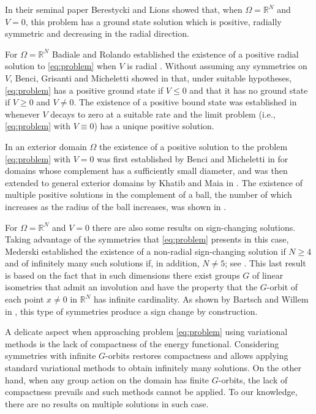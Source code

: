 \documentclass[10pt,letterpaper]{article}
\numberwithin{equation}{section}
\def\rn{\mathbb{R}^N}
\def\o{\Omega}
\begin{document}
In their seminal paper \cite{bl} Berestycki and Lions showed that, when $\o=\rn$ and $V=0$, this problem has a ground state solution which is positive, radially symmetric and decreasing in the radial direction. 

For $\o=\rn$ Badiale and Rolando established the existence of a positive radial solution to \eqref{eq:problem} when $V$ is radial \cite{br}. Without assuming any symmetries on $V$, Benci, Grisanti and Micheletti showed in \cite{bgm1} that, under suitable hypotheses, \eqref{eq:problem} has a positive ground state if $V\leq 0$ and that it has no ground state if $V\geq0$ and $V\neq 0$. The existence of a positive bound state was established in \cite{cm} whenever $V$ decays to zero at a suitable rate and the limit problem (i.e., \eqref{eq:problem} with $V\equiv 0$) has a unique positive solution.

In an exterior domain $\o$ the existence of a positive solution to the problem \eqref{eq:problem} with $V=0$ was first established by Benci and Micheletti in \cite{bm} for domains whose complement has a sufficiently small diameter, and was then extended to general exterior domains by Khatib and Maia in \cite{km}. The existence of multiple positive solutions in the complement of a ball, the number of which increases as the radius of the ball increases, was shown in \cite{cmp1}.

For $\o=\rn$ and $V=0$ there are also some results on sign-changing solutions. Taking advantage of the symmetries that \eqref{eq:problem} presents in this case, Mederski established the existence of a non-radial sign-changing solution if $N\geq 4$ and of infinitely many such solutions if, in addition, $N\neq 5$; see \cite{m1,m2}. This last result is based on the fact that in such dimensions there exist groups $G$ of linear isometries that admit an involution and have the property that the $G$-orbit of each point $x\neq 0$ in $\rn$ has infinite cardinality. As shown by Bartsch and Willem in \cite{bw}, this type of symmetries produce a sign change by construction.

A delicate aspect when approaching problem \eqref{eq:problem} using variational methods is the lack of compactness of the energy functional. Considering symmetries with infinite $G$-orbits restores compactness and allows applying standard variational methods to obtain infinitely many solutions. On the other hand, when any group action on the domain has finite $G$-orbits, the lack of compactness prevails and such methods cannot be applied. To our knowledge, there are no results on multiple solutions in such case.
\end{document}
